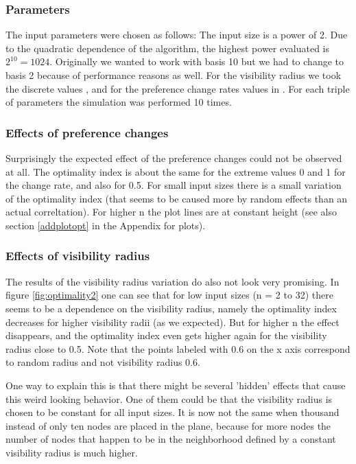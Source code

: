 \documentclass[11pt]{article}
\begin{document}
\subsubsection{Parameters}

The input parameters were chosen as follows: The input size is a power of 2. Due to the quadratic dependence of the 
algorithm, the highest power evaluated is $2^{10}=1024$. Originally we wanted to work with basis 10 but we had to change to basis 2 because
of performance reasons as well. For the visibility radius we took the discrete values , and for the preference change rates
values in . For each triple of parameters the simulation was performed 10 times.

\subsubsection{Effects of preference changes}

Surprisingly the expected effect of the preference changes could not be observed at all. The optimality index is about the same for the extreme
values 0 and 1 for the change rate, and also for 0.5. For small input sizes there is a small variation of the optimality index (that seems to be
caused more by random effects than an actual correltation). For higher n the plot lines are at constant height (see also section \ref{addplotopt}
in the Appendix for plots).

\subsubsection{Effects of visibility radius}

The results of the visibility radius variation do also not look very promising. In figure \ref{fig:optimality2} one can see that for low input sizes
(n = 2 to 32) there seems to be a dependence on the visibility radius, namely the optimality index decreases for higher visibility radii
(as we expected). But for higher n the effect disappears, and the optimality index even gets higher again for the visibility radius close to
0.5. Note that the points labeled with 0.6 on the x axis correspond to random radius and not visibility radius 0.6.

One way to explain this is that there might be several 'hidden' effects that cause this weird looking behavior. One of them could be that
the visibility radius is chosen to be constant for all input sizes. It is now not the same when thousand instead of only ten nodes are placed
in the plane, because for more nodes the number of nodes that happen to be in the neighborhood defined by a constant visibility radius is much
higher.
\end{document}
